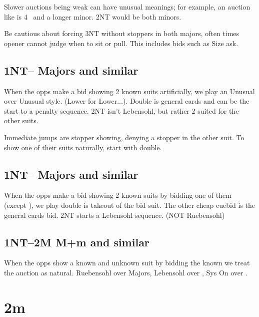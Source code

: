 \documentclass[main]{subfile}
\begin{document}
	Slower auctions being weak can have unusual meanings; for example, an auction like  is 4 \spadesuit ~and a longer minor. 2NT would be both minors. 
	
	
	Be cautious about forcing 3NT without stoppers in both majors, often times opener cannot judge when to sit or pull. This includes bids such as  Size ask. 

	\subsection{1NT-- Majors and similar}
	
	When the opps make a bid showing 2 known suits artificially, we play an Unusual over Unusual style. (Lower for Lower...). Double is general cards and can be the start to a penalty sequence. 2NT isn't Lebensohl, but rather 2 suited for the other suits.
	
	Immediate jumps are stopper showing, denying a stopper in the other suit. To show one of their suits naturally, start with double.
	
	\subsection{1NT-- Majors and similar}
	
	When the opps make a bid showing 2 known suits by bidding one of them (except ), we play double is takeout of the bid suit. The other cheap cuebid is the general cards bid. 2NT starts a Lebensohl sequence. (NOT Ruebensohl)
	
	
	\subsection{1NT--2M M+m and similar}
	
	When the opps show a known and unknown suit by bidding the known we treat the auction as natural. Ruebensohl over Majors, Lebensohl over \ddd, Sys On over \ccc.

	{\section[2C]{}}
	{\section{2m}}
	
\end{document}
